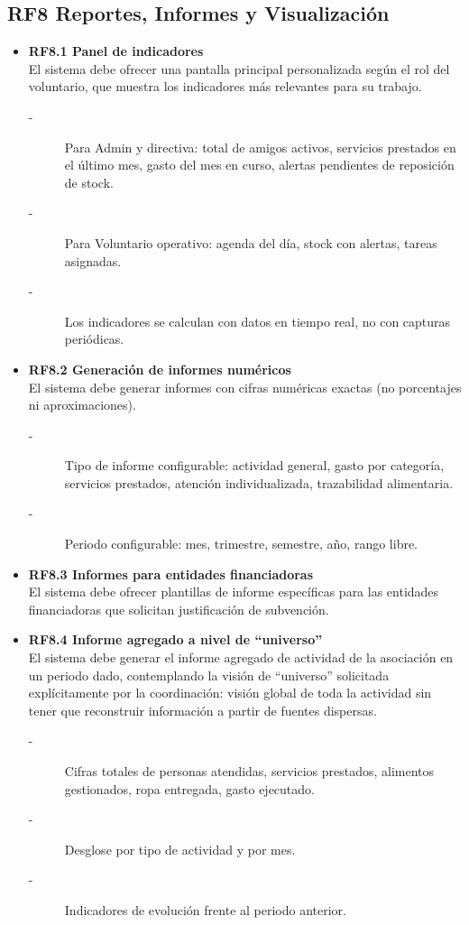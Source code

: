 \subsection{RF8 Reportes, Informes y Visualización}
\begin{itemize}
    \item \textbf{RF8.1 Panel de indicadores} \\
    El sistema debe ofrecer una pantalla principal personalizada según el
    rol del voluntario, que muestra los indicadores más relevantes para su
    trabajo.
    \begin{description}
        \item[-] Para Admin y directiva: total de amigos activos, servicios prestados
        en el último mes, gasto del mes en curso, alertas pendientes de
        reposición de stock.
        \item[-] Para Voluntario operativo: agenda del día, stock con alertas, tareas asignadas.
        \item[-] Los indicadores se calculan con datos en tiempo real, no con capturas periódicas.
    \end{description}


    \item \textbf{RF8.2 Generación de informes numéricos} \\
    El sistema debe generar informes con cifras numéricas exactas (no porcentajes ni aproximaciones).
    \begin{description}
        \item[-] Tipo de informe configurable: actividad general, gasto por categoría,
        servicios prestados, atención individualizada, trazabilidad
        alimentaria. 
        \item[-] Periodo configurable: mes, trimestre, semestre, año, rango libre.
    \end{description}


    \item \textbf{RF8.3 Informes para entidades financiadoras} \\
    El sistema debe ofrecer plantillas de informe específicas para las
    entidades financiadoras que solicitan justificación de subvención.


    \item \textbf{RF8.4 Informe agregado a nivel de ``universo''} \\
    El sistema debe generar el informe agregado de actividad de la
    asociación en un periodo dado, contemplando la visión de ``universo''
    solicitada explícitamente por la coordinación: visión global de toda la
    actividad sin tener que reconstruir información a partir de fuentes
    dispersas.
    \begin{description}
        \item[-] Cifras totales de personas atendidas, servicios prestados, alimentos
        gestionados, ropa entregada, gasto ejecutado. 
        \item[-] Desglose por tipo de actividad y por mes.
        \item[-] Indicadores de evolución frente al periodo anterior. 
    \end{description}



\end{itemize}
